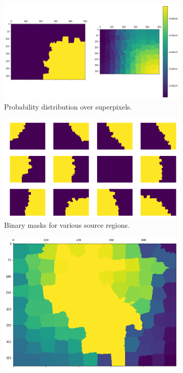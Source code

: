 \documentclass[twocolumn]{article}
\begin{document}
\begin{figure}[t]
  \centering

  \begin{subfigure}{0.49\linewidth}
    \includegraphics[width=\linewidth]{figs/single_source.png}
    \caption{Probability distribution over superpixels.}
  \end{subfigure}
  \begin{subfigure}{0.49\linewidth}
    \includegraphics[width=\linewidth]{figs/many_sources.png}
    \caption{Binary masks for various source regions.}
  \end{subfigure}
  \begin{subfigure}{0.49\linewidth}
    \includegraphics[width=\linewidth]{figs/aggregate.png}

\end{subfigure}
\end{figure}
\end{document}
